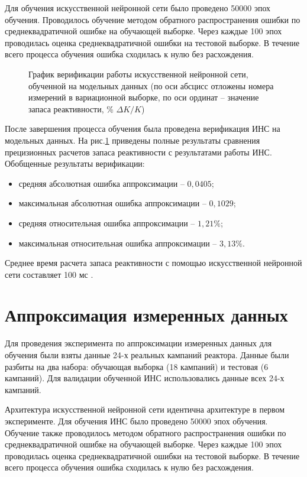Для обучения искусственной нейронной сети было проведено 50000 эпох обучения.
Проводилось обучение методом обратного распространения ошибки по среднеквадратичной ошибке на обучающей выборке.
Через каждые 100 эпох проводилась оценка среднеквадратичной ошибки на тестовой выборке.
В течение всего процесса обучения ошибка сходилась к нулю без расхождения.

\begin{figure}[p]
    \caption[График верификации ИНС на модельных данных]{График верификации работы искусственной нейронной сети, обученной на модельных данных (по оси абсцисс отложены номера измерений в вариационной выборке, по оси ординат -- значение запаса реактивности,
    \% $\Delta K/K$)}
    \label{pic:model-rus}
\end{figure}

После завершения процесса обучения была проведена верификация ИНС на модельных данных.
На рис.\ref{pic:model-rus} приведены полные результаты сравнения прецизионных расчетов запаса реактивности с результатами работы ИНС.
Обобщенные результаты верификации:

\begin{itemize}
\item
  средняя абсолютная ошибка аппроксимации -- $0,0405$;
\item
  максимальная абсолютная ошибка аппроксимации -- $0,1029$;
\item
  средняя относительная ошибка аппроксимации -- $1,21\%$;
\item
  максимальная относительная ошибка аппроксимации -- $3,13\%$.
\end{itemize}

Среднее время расчета запаса реактивности с помощью искусственной
нейронной сети составляет 100 мс \cite{iop-2018}.

\section{Аппроксимация измеренных данных}

Для проведения эксперимента по аппроксимации измеренных данных для обучения были взяты данные 24-х реальных кампаний реактора.
Данные были разбиты на два набора: обучающая выборка (18 кампаний) и тестовая (6 кампаний).
Для валидации обученной ИНС использовались данные всех 24-х кампаний.

Архитектура искусственной нейронной сети идентична архитектуре в первом
эксперименте.
Для обучения ИНС было проведено 50000 эпох обучения.
Обучение также проводилось методом обратного распространения ошибки по среднеквадратичной ошибке на обучающей выборке.
Через каждые 100 эпох проводилась оценка среднеквадратичной ошибки на тестовой выборке. В течение всего процесса обучения ошибка сходилась к нулю без расхождения.

